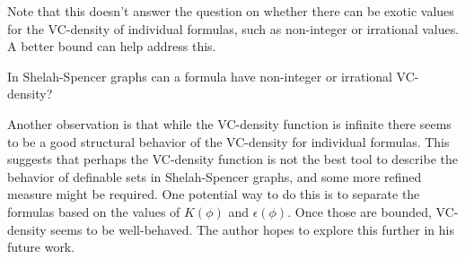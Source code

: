 Note that this \chapa doesn't answer the question on whether there can be exotic values for the VC-density of individual formulas,
such as non-integer or irrational values.
A better bound can help address this.
\begin{openq}
  In Shelah-Spencer graphs can a formula have non-integer or irrational VC-density?
\end{openq}
Another observation is that while the VC-density function is infinite
there seems to be a good structural behavior of the VC-density for individual formulas.
This suggests that perhaps the VC-density function is not the best tool to describe the behavior of definable sets in Shelah-Spencer graphs,
and some more refined measure might be required.
One potential way to do this is to separate the formulas based on the values of $K(\phi)$ and $\epsilon(\phi)$.
Once those are bounded, VC-density seems to be well-behaved.
The author hopes to explore this further in his future work.
